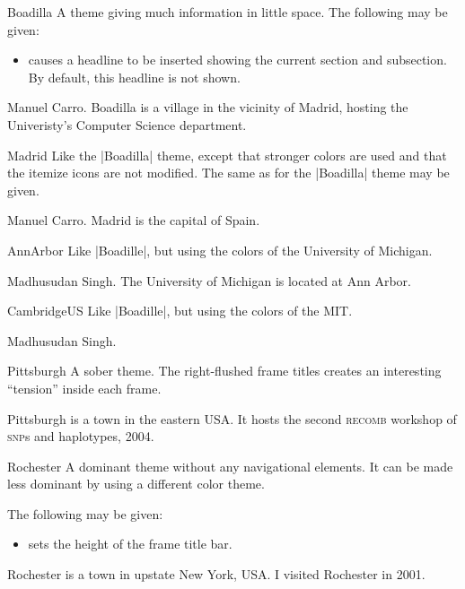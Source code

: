 \begin{themeexample}{Boadilla}
  A theme giving much information in little space. The following  may be given:
  \begin{itemize}
  \item {} causes a headline to be inserted showing the current section and subsection. By default, this headline is not shown.
  \end{itemize}

  \themeauthor Manuel Carro. Boadilla is a village in the vicinity of Madrid, hosting the Univeristy's Computer Science department.
\end{themeexample}

\begin{themeexample}{Madrid}
  Like the |Boadilla| theme, except that stronger colors are used and that the itemize icons are not modified. The same  as for the |Boadilla| theme may be given.

  \themeauthor Manuel Carro. Madrid is the capital of Spain.
\end{themeexample}

\begin{themeexample}{AnnArbor}
  Like |Boadille|, but using the colors of the University of Michigan.

  \themeauthor Madhusudan Singh. The University of Michigan is located at Ann Arbor.
\end{themeexample}

\begin{themeexample}{CambridgeUS}
  Like |Boadille|, but using the colors of the MIT.

  \themeauthor Madhusudan Singh.
\end{themeexample}

\begin{themeexample}{Pittsburgh}
  A sober theme. The right-flushed frame titles creates an interesting ``tension'' inside each frame.

  Pittsburgh is a town in the eastern USA. It hosts the second \textsc{recomb} workshop of \textsc{snp}s and haplotypes, 2004.
\end{themeexample}

\begin{themeexample}{Rochester}
  A dominant theme without any navigational elements. It can be made less dominant by using a different color theme.

  The following  may be given:
  \begin{itemize}
  \item {} sets the height of the frame title bar.
  \end{itemize}

  Rochester is a town in upstate New York, USA. I visited Rochester in 2001.
\end{themeexample}


